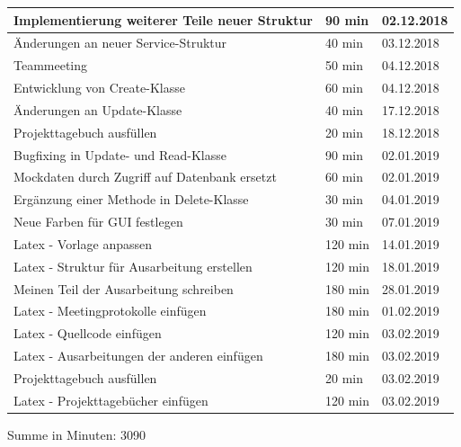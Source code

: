 \begin{longtable}{|p{10cm}|p{2cm}|p{2cm}|}
Implementierung weiterer Teile neuer Struktur & 90 min & 02.12.2018 \\ \hline
Änderungen an neuer Service-Struktur & 40 min & 03.12.2018 \\ \hline
Teammeeting & 50 min & 04.12.2018 \\ \hline
Entwicklung von Create-Klasse & 60 min & 04.12.2018 \\ \hline
Änderungen an Update-Klasse & 40 min & 17.12.2018 \\ \hline
Projekttagebuch ausfüllen & 20 min & 18.12.2018 \\ \hline
Bugfixing in Update- und Read-Klasse & 90 min & 02.01.2019 \\ \hline
Mockdaten durch Zugriff auf Datenbank ersetzt & 60 min & 02.01.2019 \\ \hline
Ergänzung einer Methode in Delete-Klasse & 30 min & 04.01.2019 \\ \hline
Neue Farben für GUI festlegen & 30 min & 07.01.2019 \\ \hline
Latex - Vorlage anpassen & 120 min & 14.01.2019 \\ \hline
Latex - Struktur für Ausarbeitung erstellen & 120 min & 18.01.2019 \\ \hline
Meinen Teil der Ausarbeitung schreiben & 180 min & 28.01.2019 \\ \hline
Latex - Meetingprotokolle einfügen & 180 min & 01.02.2019 \\ \hline
Latex - Quellcode einfügen & 120 min & 03.02.2019 \\ \hline
Latex - Ausarbeitungen der anderen einfügen & 180 min & 03.02.2019 \\ \hline
Projekttagebuch ausfüllen & 20 min & 03.02.2019 \\ \hline
Latex - Projekttagebücher einfügen & 120 min & 03.02.2019 \\ \hline
\end{longtable}
Summe in Minuten: 3090

\newpage
